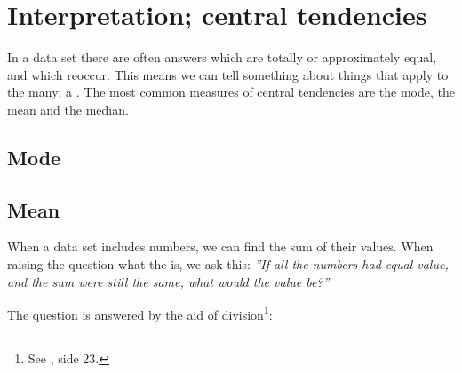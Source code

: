 \section{Interpretation; central tendencies}
In a data set there are often answers which are totally or approximately equal, and which reoccur. This means we can tell something about things that apply to the many; a . The most common measures of central tendencies are the mode, the mean and the median.
\subsection{Mode}
 \regv
{} \regv

\newpage
\subsection{Mean}
When a data set includes numbers, we can find the sum of their values. When raising the question what the  is, we ask this: \os
\textsl{''If all the numbers had equal value, and the sum were still the same, what would the value be?''}\os

The question is answered by the aid of division\footnote{See \mb, side 23.}: \regv

 \regv
{}\vsk 

